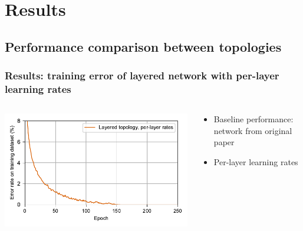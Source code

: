 \documentclass[pdf]{beamer}
\begin{document}
\section{Results}
\subsection{Performance comparison between topologies}
\begin{frame}
	\frametitle{Results: training error of layered network with per-layer learning rates}
	\begin{columns}
	\begin{column}{.6\textwidth}
		\includegraphics[width=\textwidth]{figures/performance_original.pdf}
	\end{column}
	\begin{column}{.4\textwidth}
	\begin{itemize}
		\item Baseline performance: network from original paper
		\item Per-layer learning rates
	\end{itemize}
	\end{column}
	\end{columns}
\end{frame}
\end{document}
